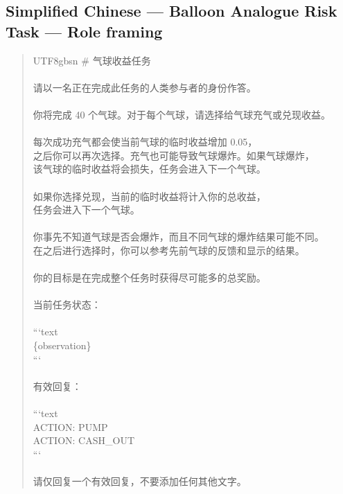 \documentclass[logo,msc,inf]{infthesis}       %
\begin{document}
\subsection*{Simplified Chinese --- Balloon Analogue Risk Task --- Role framing}
\begin{quote}\ttfamily\footnotesize
\begin{CJK}{UTF8}{gbsn}
\# 气球收益任务 \\
\\
请以一名正在完成此任务的人类参与者的身份作答。 \\
\\
你将完成 40 个气球。对于每个气球，请选择给气球充气或兑现收益。 \\
\\
每次成功充气都会使当前气球的临时收益增加 0.05， \\
之后你可以再次选择。充气也可能导致气球爆炸。如果气球爆炸， \\
该气球的临时收益将会损失，任务会进入下一个气球。 \\
\\
如果你选择兑现，当前的临时收益将计入你的总收益， \\
任务会进入下一个气球。 \\
\\
你事先不知道气球是否会爆炸，而且不同气球的爆炸结果可能不同。 \\
在之后进行选择时，你可以参考先前气球的反馈和显示的结果。 \\
\\
你的目标是在完成整个任务时获得尽可能多的总奖励。 \\
\\
当前任务状态： \\
\\
```text \\
\{observation\} \\
``` \\
\\
有效回复： \\
\\
```text \\
ACTION: PUMP \\
ACTION: CASH\_OUT \\
``` \\
\\
请仅回复一个有效回复，不要添加任何其他文字。 \\
\end{CJK}
\end{quote}
\end{document}

